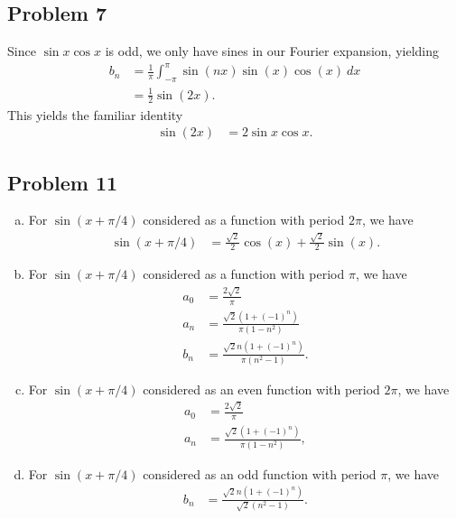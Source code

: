 \documentclass[10pt]{mypackage}
\begin{document}
\subsection{Problem 7}%
Since $\sin x \cos x$ is odd, we only have sines in our Fourier expansion, yielding
\begin{align*}
  b_n &= \frac{1}{\pi}\int_{-\pi}^{\pi} \sin\left(n x\right)\sin\left(x\right)\cos\left(x\right)\:dx\\
      &= \frac{1}{2}\sin\left(2x\right).
\end{align*}
This yields the familiar identity
\begin{align*}
  \sin\left(2x\right) &= 2\sin x \cos x.
\end{align*}
\subsection{Problem 11}%
\begin{enumerate}[(a)]
  \item For $\sin\left(x + \pi/4\right)$ considered as a function with period $2\pi$, we have
    \begin{align*}
      \sin\left(x + \pi/4\right) &= \frac{\sqrt{2}}{2}\cos\left(x\right) + \frac{\sqrt{2}}{2}\sin\left(x\right).
    \end{align*}
  \item For $\sin\left(x + \pi/4\right)$ considered as a function with period $\pi$, we have
    \begin{align*}
      a_0 &= \frac{2\sqrt{2}}{\pi}\\
      a_n &= \frac{\sqrt{2}\left(1 + \left(-1\right)^n\right)}{\pi\left(1-n^2\right)}\\
      b_n &= \frac{\sqrt{2}n\left(1 + \left(-1\right)^n\right)}{\pi\left(n^2 - 1\right)}.
    \end{align*}
  \item For $\sin\left(x + \pi/4\right)$ considered as an even function with period $2\pi$, we have
    \begin{align*}
      a_0 &= \frac{2\sqrt{2}}{\pi}\\
      a_n &= \frac{\sqrt{2}\left(1 + \left(-1\right)^n\right)}{\pi\left(1-n^2\right)},
    \end{align*}
  \item For $\sin\left(x + \pi/4\right)$ considered as an odd function with period $\pi$, we have
    \begin{align*}
      b_n &= \frac{\sqrt{2}n \left(1 + \left(-1\right)^n\right)}{\sqrt{2}\left(n^2 - 1\right)}.
    \end{align*}
\end{enumerate}
\end{document}
